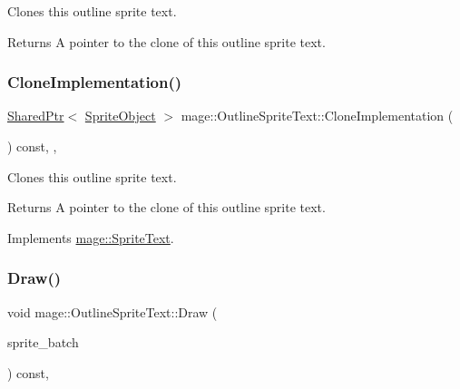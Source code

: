 Clones this outline sprite text.

\begin{DoxyReturn}{Returns}
A pointer to the clone of this outline sprite text. 
\end{DoxyReturn}
\hypertarget{classmage_1_1_outline_sprite_text_a90ed9cba10e082d6ce07dfa1b6189246}{}\label{classmage_1_1_outline_sprite_text_a90ed9cba10e082d6ce07dfa1b6189246} 
\subsubsection{\texorpdfstring{Clone\+Implementation()}{CloneImplementation()}}
{\footnotesize\ttfamily \hyperlink{namespacemage_a1e01ae66713838a7a67d30e44c67703e}{Shared\+Ptr}$<$ \hyperlink{classmage_1_1_sprite_object}{Sprite\+Object} $>$ mage\+::\+Outline\+Sprite\+Text\+::\+Clone\+Implementation (\begin{DoxyParamCaption}{ }\end{DoxyParamCaption}) const\hspace{0.3cm}{\ttfamily [override]}, {\ttfamily [private]}, {\ttfamily [virtual]}}

Clones this outline sprite text.

\begin{DoxyReturn}{Returns}
A pointer to the clone of this outline sprite text. 
\end{DoxyReturn}


Implements \hyperlink{classmage_1_1_sprite_text_acf74e687f38c6253bf5851bc4548352e}{mage\+::\+Sprite\+Text}.

\hypertarget{classmage_1_1_outline_sprite_text_a524e9ad1caeeeaa32405e61d1a5e1032}{}\label{classmage_1_1_outline_sprite_text_a524e9ad1caeeeaa32405e61d1a5e1032} 
\subsubsection{\texorpdfstring{Draw()}{Draw()}}
{\footnotesize\ttfamily void mage\+::\+Outline\+Sprite\+Text\+::\+Draw (\begin{DoxyParamCaption}\item[{Sprite\+Batch \&}]{sprite\+\_\+batch }\end{DoxyParamCaption}) const\hspace{0.3cm}{\ttfamily [override]}, {\ttfamily [virtual]}}

